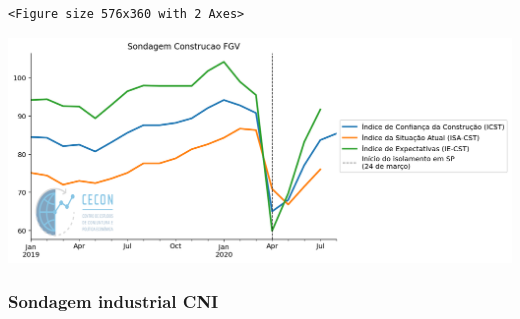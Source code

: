 \documentclass[11pt]{article}
\begin{document}
\begin{verbatim}
<Figure size 576x360 with 2 Axes>
\end{verbatim}


\begin{center}
\includegraphics[width=.9\linewidth]{obipy-resources/62e383af79e91b63c7fc98dd7fb55b3c3ececcb9/5c55149be31444f847711890239c1aa99b605e4e.png}
\end{center}

\subsubsection{Sondagem industrial CNI}
\label{sec:orgbbf3a96}
\end{document}
